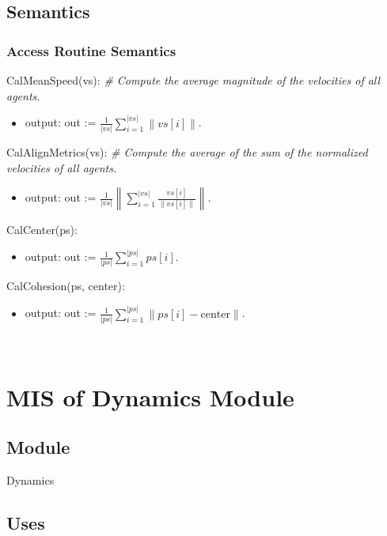 \documentclass[12pt, titlepage]{article}
\begin{document}
\subsection{Semantics}

\subsubsection{Access Routine Semantics}

\noindent CalMeanSpeed(vs):
\textit{\# Compute the average magnitude of the velocities of all agents.}
\begin{itemize}
\item output: out := $\frac{1}{|vs|} \sum_{i=1}^{|vs|} \left\lVert vs[i] \right\rVert$. 
\end{itemize}

\noindent CalAlignMetrics(vs):
\textit{\# Compute the average of the sum of the normalized velocities of all agents.}
\begin{itemize}
\item output: out := $\frac{1}{|vs|}\left\|\sum_{i=1}^{|vs|}\frac{vs[i]}{\|vs[i]\|}\right\|$. 
\end{itemize}

\noindent CalCenter(ps):
\begin{itemize}
\item output: out := $\frac{1}{|ps|} \sum_{i=1}^{|ps|} ps[i]$. 
\end{itemize}

\noindent CalCohesion(ps, center):
\begin{itemize}
\item output: out := $\frac{1}{|ps|} \sum_{i=1}^{|ps|} \left\| ps[i] - \text{center} \right\|$. 
\end{itemize}

~\newpage

\section{MIS of Dynamics Module} \label{mDyna}

\subsection{Module}

Dynamics

\subsection{Uses}
\end{document}

